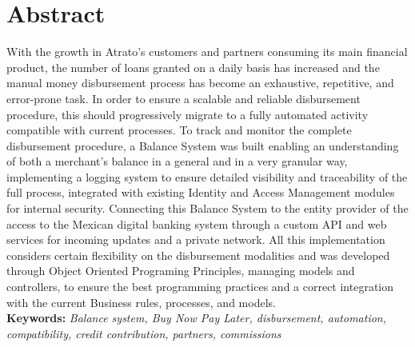 
\chapter*{Abstract}

With the growth in Atrato’s customers and partners consuming its main financial product, the number of loans granted on a daily basis has increased and the manual money disbursement process has become an exhaustive, repetitive, and error-prone task. 
In order to ensure a scalable and reliable disbursement procedure, this should progressively migrate to a fully automated activity compatible with current processes.
To track and monitor the complete disbursement procedure, a Balance System was built enabling an understanding of both a merchant's balance in a general and in a very granular way, implementing a logging system to ensure detailed visibility and traceability of the full process, integrated with existing Identity and Access Management modules for internal security.
 Connecting this Balance System to the entity provider of the access to the Mexican digital banking system through a custom API and web services for incoming updates and a private network. All this implementation considers certain flexibility on the disbursement modalities and was developed through Object Oriented Programing Principles, managing models and controllers, to ensure the best programming practices and a correct integration with the current Business rules, processes, and models.\\

 \textbf{Keywords: }\textit{Balance system, Buy Now Pay Later, disbursement, automation, compatibility, credit contribution, partners, commissions}